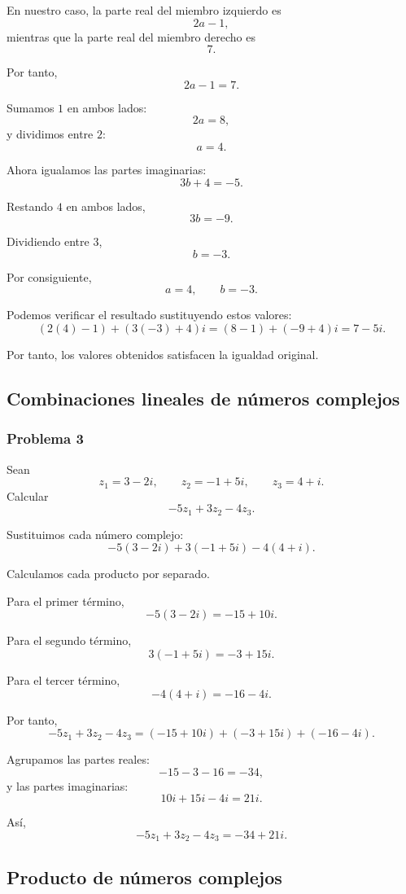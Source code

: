 \documentclass[12pt]{article}
\begin{document}
En nuestro caso, la parte real del miembro izquierdo es
\[
2a-1,
\]
mientras que la parte real del miembro derecho es
\[
7.
\]

Por tanto,
\[
2a-1=7.
\]

Sumamos $1$ en ambos lados:
\[
2a=8,
\]
y dividimos entre $2$:
\[
\boxed{a=4}.
\]

Ahora igualamos las partes imaginarias:
\[
3b+4=-5.
\]

Restando $4$ en ambos lados,
\[
3b=-9.
\]

Dividiendo entre $3$,
\[
\boxed{b=-3}.
\]

Por consiguiente,
\[
\boxed{a=4,\qquad b=-3}.
\]

Podemos verificar el resultado sustituyendo estos valores:
\[
(2(4)-1)+(3(-3)+4)i
=
(8-1)+(-9+4)i
=
7-5i.
\]

Por tanto, los valores obtenidos satisfacen la igualdad original.

\subsection{Combinaciones lineales de números complejos}

\subsubsection*{Problema 3}

Sean
\[
z_1=3-2i,
\qquad
z_2=-1+5i,
\qquad
z_3=4+i.
\]
Calcular
\[
-5z_1+3z_2-4z_3.
\]

Sustituimos cada número complejo:
\[
-5(3-2i)+3(-1+5i)-4(4+i).
\]

Calculamos cada producto por separado.

Para el primer término,
\[
-5(3-2i)
=
-15+10i.
\]

Para el segundo término,
\[
3(-1+5i)
=
-3+15i.
\]

Para el tercer término,
\[
-4(4+i)
=
-16-4i.
\]

Por tanto,
\[
-5z_1+3z_2-4z_3
=
(-15+10i)+(-3+15i)+(-16-4i).
\]

Agrupamos las partes reales:
\[
-15-3-16=-34,
\]
y las partes imaginarias:
\[
10i+15i-4i=21i.
\]

Así,
\[
\boxed{
-5z_1+3z_2-4z_3=-34+21i
}.
\]

\subsection{Producto de números complejos}
\end{document}
